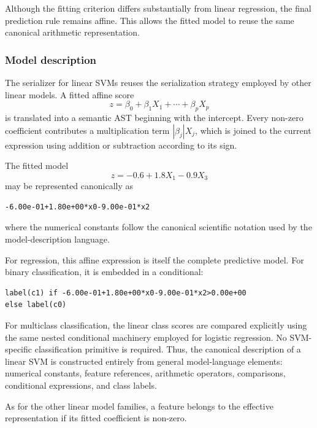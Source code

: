 Although the fitting criterion differs substantially from linear regression, the final prediction rule remains affine. This allows the fitted model to reuse the same canonical arithmetic representation.


\subsubsection{Model description}

The serializer for linear SVMs reuses the serialization strategy employed by other linear models. A fitted affine score
\[
z = \beta_0 + \beta_1 X_1 + \cdots + \beta_p X_p
\]
is translated into a semantic AST beginning with the intercept. Every non-zero coefficient contributes a multiplication term $|\beta_j|X_j$, which is joined to the current expression using addition or subtraction
according to its sign.

\begin{example}
The fitted model
\[
z = -0.6 + 1.8X_1 - 0.9X_3
\]
may be represented canonically as

\begin{verbatim}
-6.00e-01+1.80e+00*x0-9.00e-01*x2
\end{verbatim}

where the numerical constants follow the canonical scientific notation used by the model-description language.
\end{example}

For regression, this affine expression is itself the complete predictive model. For binary classification, it is embedded in a conditional:

\begin{verbatim}
label(c1) if -6.00e-01+1.80e+00*x0-9.00e-01*x2>0.00e+00
else label(c0)
\end{verbatim}

For multiclass classification, the linear class scores are compared explicitly using the same nested conditional machinery employed for logistic regression. No SVM-specific classification primitive is required. Thus, the canonical description of a linear SVM is constructed entirely from general model-language elements: numerical constants, feature references, arithmetic operators, comparisons, conditional expressions, and class labels.

As for the other linear model families, a feature belongs to the effective representation if its fitted coefficient is non-zero.

